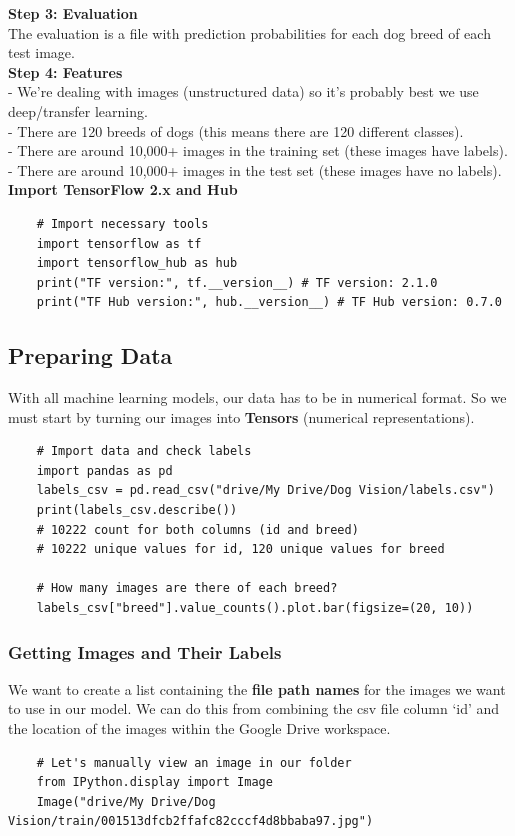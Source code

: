 \documentclass[11pt, a4paper]{article}
\begin{document}
\begin{spacing}{1.1}
	\textbf{Step 3: Evaluation} \\
	The evaluation is a file with prediction probabilities for each dog breed of each test image. \vspace*{1.5mm} \\
	\textbf{Step 4: Features} \\
	\hspace*{2mm} - We're dealing with images (unstructured data) so it's probably best we use deep/transfer learning. \\
	\hspace*{2mm} - There are 120 breeds of dogs (this means there are 120 different classes). \\
	\hspace*{2mm} - There are around 10,000+ images in the training set (these images have labels). \\
	\hspace*{2mm} - There are around 10,000+ images in the test set (these images have no labels). \vspace*{1.5mm} \\
	\textbf{Import TensorFlow 2.x and Hub}
	\begin{lstlisting}
	# Import necessary tools
	import tensorflow as tf
	import tensorflow_hub as hub 
	print("TF version:", tf.__version__) # TF version: 2.1.0
	print("TF Hub version:", hub.__version__) # TF Hub version: 0.7.0 \end{lstlisting} \newpage

	\subsection{Preparing Data}
	With all machine learning models, our data has to be in numerical format. So we must start by turning our images into \textbf{Tensors} (numerical representations).
	\begin{lstlisting}
	# Import data and check labels
	import pandas as pd
	labels_csv = pd.read_csv("drive/My Drive/Dog Vision/labels.csv")
	print(labels_csv.describe())
	# 10222 count for both columns (id and breed)
	# 10222 unique values for id, 120 unique values for breed 
	
	# How many images are there of each breed?
	labels_csv["breed"].value_counts().plot.bar(figsize=(20, 10)) \end{lstlisting} \vspace*{1mm}
	\subsubsection{Getting Images and Their Labels}
	We want to create a list containing the \textbf{file path names} for the images we want to use in our model. We can do this from combining the csv file column `id' and the location of the images within the Google Drive workspace.
	\begin{lstlisting}
	# Let's manually view an image in our folder
	from IPython.display import Image
	Image("drive/My Drive/Dog Vision/train/001513dfcb2ffafc82cccf4d8bbaba97.jpg")
	

\end{lstlisting}
\end{spacing}
\end{document}
